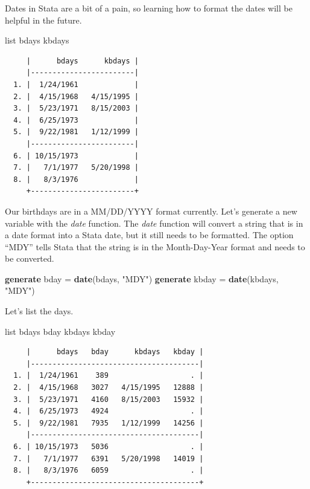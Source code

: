 \documentclass[
]{book}
\newenvironment{Shaded}{\begin{snugshade}}{\end{snugshade}}
\newcommand{\FunctionTok}[1]{\textcolor[rgb]{0.13,0.29,0.53}{\textbf{#1}}}
\newcommand{\KeywordTok}[1]{\textcolor[rgb]{0.13,0.29,0.53}{\textbf{#1}}}
\newcommand{\NormalTok}[1]{#1}
\newcommand{\OtherTok}[1]{\textcolor[rgb]{0.56,0.35,0.01}{#1}}
\newcommand{\StringTok}[1]{\textcolor[rgb]{0.31,0.60,0.02}{#1}}
\begin{document}
Dates in Stata are a bit of a pain, so learning how to format the dates will be helpful in the future.

\begin{Shaded}
\begin{Highlighting}[]
\OtherTok{list}\NormalTok{ bdays kbdays}
\end{Highlighting}
\end{Shaded}

\begin{verbatim}
     |      bdays      kbdays |
     |------------------------|
  1. |  1/24/1961             |
  2. |  4/15/1968   4/15/1995 |
  3. |  5/23/1971   8/15/2003 |
  4. |  6/25/1973             |
  5. |  9/22/1981   1/12/1999 |
     |------------------------|
  6. | 10/15/1973             |
  7. |   7/1/1977   5/20/1998 |
  8. |   8/3/1976             |
     +------------------------+
\end{verbatim}

Our birthdays are in a MM/DD/YYYY format currently. Let's generate a new variable with the \emph{date} function. The \emph{date} function will convert a string that is in a date format into a Stata date, but it still needs to be formatted. The option ``MDY'' tells Stata that the string is in the Month-Day-Year format and needs to be converted.

\begin{Shaded}
\begin{Highlighting}[]
\KeywordTok{generate}\NormalTok{ bday = }\FunctionTok{date}\NormalTok{(bdays, }\StringTok{"MDY"}\NormalTok{)}
\KeywordTok{generate}\NormalTok{ kbday = }\FunctionTok{date}\NormalTok{(kbdays, }\StringTok{"MDY"}\NormalTok{)}
\end{Highlighting}
\end{Shaded}

Let's list the days.

\begin{Shaded}
\begin{Highlighting}[]
\OtherTok{list}\NormalTok{ bdays bday kbdays kbday}
\end{Highlighting}
\end{Shaded}

\begin{verbatim}
     |      bdays   bday      kbdays   kbday |
     |---------------------------------------|
  1. |  1/24/1961    389                   . |
  2. |  4/15/1968   3027   4/15/1995   12888 |
  3. |  5/23/1971   4160   8/15/2003   15932 |
  4. |  6/25/1973   4924                   . |
  5. |  9/22/1981   7935   1/12/1999   14256 |
     |---------------------------------------|
  6. | 10/15/1973   5036                   . |
  7. |   7/1/1977   6391   5/20/1998   14019 |
  8. |   8/3/1976   6059                   . |
     +---------------------------------------+
\end{verbatim}
\end{document}
